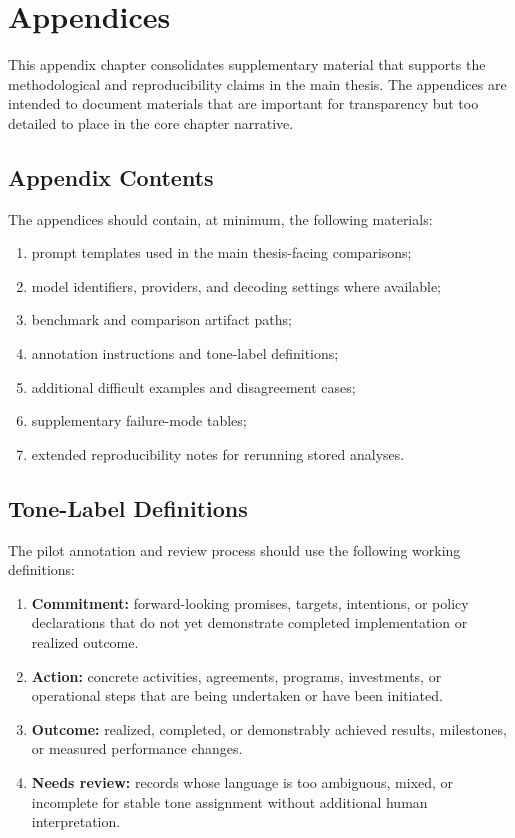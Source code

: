 \documentclass[12pt,a4paper]{report}
\providecommand{\tightlist}{\setlength{\itemsep}{0pt}\setlength{\parskip}{0pt}}
\begin{document}
\tableofcontents
\clearpage
\chapter{Appendices}\label{appendices}

This appendix chapter consolidates supplementary material that supports the methodological and reproducibility claims in the main thesis. The appendices are intended to document materials that are important for transparency but too detailed to place in the core chapter narrative.

\section{Appendix Contents}\label{appendix-contents}

The appendices should contain, at minimum, the following materials:

\begin{enumerate}
\def\labelenumi{\arabic{enumi}.}
\tightlist
\item
  prompt templates used in the main thesis-facing comparisons;
\item
  model identifiers, providers, and decoding settings where available;
\item
  benchmark and comparison artifact paths;
\item
  annotation instructions and tone-label definitions;
\item
  additional difficult examples and disagreement cases;
\item
  supplementary failure-mode tables;
\item
  extended reproducibility notes for rerunning stored analyses.
\end{enumerate}

\section{Tone-Label Definitions}\label{tone-label-definitions}

The pilot annotation and review process should use the following working definitions:

\begin{enumerate}
\def\labelenumi{\arabic{enumi}.}
\tightlist
\item
  \textbf{Commitment:} forward-looking promises, targets, intentions, or policy declarations that do not yet demonstrate completed implementation or realized outcome.
\item
  \textbf{Action:} concrete activities, agreements, programs, investments, or operational steps that are being undertaken or have been initiated.
\item
  \textbf{Outcome:} realized, completed, or demonstrably achieved results, milestones, or measured performance changes.
\item
  \textbf{Needs review:} records whose language is too ambiguous, mixed, or incomplete for stable tone assignment without additional human interpretation.
\end{enumerate}
\end{document}
